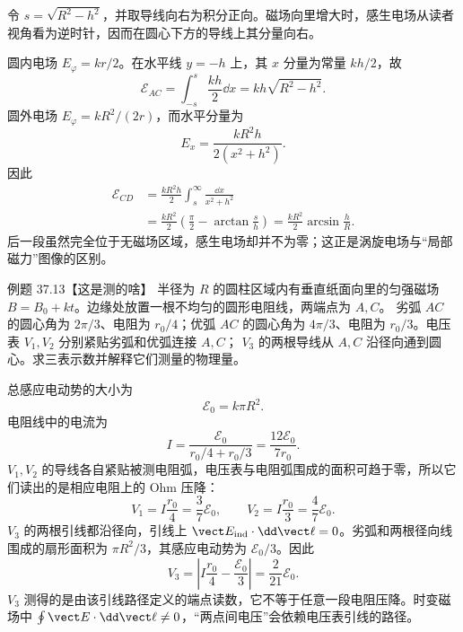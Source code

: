 \begin{xesolution}
令 $s=\sqrt{R^2-h^2}$，并取导线向右为积分正向。磁场向里增大时，感生电场从读者视角看为逆时针，因而在圆心下方的导线上其分量向右。

圆内电场 $E_\varphi=kr/2$。在水平线 $y=-h$ 上，其 $x$ 分量为常量 $kh/2$，故
\begin{equation}
  \boxed{\mathcal E_{AC}=\int_{-s}^{s}\frac{kh}{2}\dd x
  =kh\sqrt{R^2-h^2}}.
\end{equation}
圆外电场 $E_\varphi=kR^2/(2r)$，而水平分量为
\begin{equation}
  E_x=\frac{kR^2h}{2(x^2+h^2)}.
\end{equation}
因此
\begin{align}
  \mathcal E_{CD}
  &=\frac{kR^2h}{2}\int_s^\infty\frac{\dd x}{x^2+h^2}\\
  &=\frac{kR^2}{2}\left(\frac\pi2-\arctan\frac{s}{h}\right)
   =\boxed{\frac{kR^2}{2}\arcsin\frac hR}.
\end{align}
后一段虽然完全位于无磁场区域，感生电场却并不为零；这正是涡旋电场与“局部磁力”图像的区别。

\chordEmfDiagram
\end{xesolution}

\Needspace{0.12\textheight}
\begin{origexamplebox}{例题 37.13【这是测的啥】}
半径为 $R$ 的圆柱区域内有垂直纸面向里的匀强磁场 $B=B_0+kt$。边缘处放置一根不均匀的圆形电阻线，两端点为 $A,C$。
劣弧 $AC$ 的圆心角为 $2\pi/3$、电阻为 $r_0/4$；优弧 $AC$ 的圆心角为 $4\pi/3$、电阻为 $r_0/3$。电压表 $V_1,V_2$ 分别紧贴劣弧和优弧连接 $A,C$；
$V_3$ 的两根导线从 $A,C$ 沿径向通到圆心。求三表示数并解释它们测量的物理量。
\end{origexamplebox}

\begin{xesolution}
总感应电动势的大小为
\begin{equation}
  \mathcal E_0=k\pi R^2.
\end{equation}
电阻线中的电流为
\begin{equation}
  I=\frac{\mathcal E_0}{r_0/4+r_0/3}
  =\frac{12\mathcal E_0}{7r_0}.
\end{equation}
$V_1,V_2$ 的导线各自紧贴被测电阻弧，电压表与电阻弧围成的面积可趋于零，所以它们读出的是相应电阻上的 Ohm 压降：
\begin{equation}
  \boxed{V_1=I\frac{r_0}{4}=\frac37\mathcal E_0},
  \qquad
  \boxed{V_2=I\frac{r_0}{3}=\frac47\mathcal E_0}.
\end{equation}
$V_3$ 的两根引线都沿径向，引线上 $\vect E_{\rm ind}\cdot\dd\vect\ell=0$。劣弧和两根径向线围成的扇形面积为 $\pi R^2/3$，其感应电动势为 $\mathcal E_0/3$。因此
\begin{equation}
  \boxed{V_3=\left|I\frac{r_0}{4}-\frac{\mathcal E_0}{3}\right|
  =\frac{2}{21}\mathcal E_0}.
\end{equation}
$V_3$ 测得的是由该引线路径定义的端点读数，它不等于任意一段电阻压降。时变磁场中 $\oint\vect E\cdot\dd\vect\ell\ne0$，“两点间电压”会依赖电压表引线的路径。

\circularVoltmetersDiagram
\end{xesolution}

